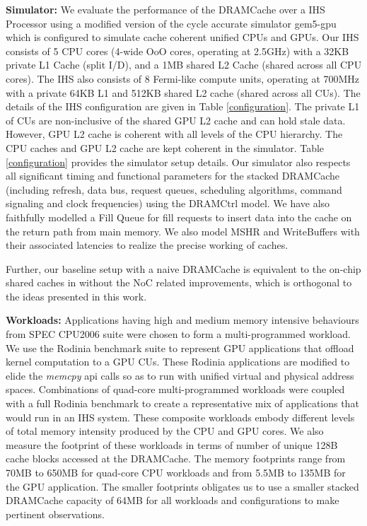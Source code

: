 \par \textbf{Simulator:} We evaluate the performance of the DRAMCache over a IHS Processor using a modified version of the cycle accurate simulator gem5-gpu \cite{gem5-gpu} which is configured to simulate cache coherent unified CPUs and GPUs. 
Our IHS consists of 5 CPU cores (4-wide OoO cores, operating at 2.5GHz) with a 32KB private L1 Cache (split I/D), and a 1MB shared L2 Cache (shared across all CPU cores). The IHS also consists of 8 Fermi-like compute units, operating at 700MHz with a private 64KB L1 and 512KB shared L2 cache (shared across all CUs). The details of the IHS configuration are given in Table \ref{configuration}. The private L1 of CUs are non-inclusive of the shared GPU L2 cache and can hold stale data. However, GPU L2 cache is coherent with all levels of the CPU hierarchy. The CPU caches and GPU L2 cache are kept coherent in the simulator. Table \ref{configuration} provides the simulator setup details. 
Our simulator also respects all significant timing and functional parameters for the stacked DRAMCache (including refresh, data bus, request queues, scheduling algorithms, command signaling and clock frequencies) using the DRAMCtrl \cite{dramctrl} model. We have also faithfully modelled  a Fill Queue \cite{dca} for fill requests to insert data into the cache on the return path from main memory. We also model MSHR and WriteBuffers with their associated latencies to realize the precise working of caches. 
\par Further, our baseline setup with a naive DRAMCache is equivalent to the on-chip shared caches in \cite{oscar} without the NoC related improvements, which is orthogonal to the ideas presented in this work.

\par \textbf{Workloads:} Applications having high and medium memory intensive behaviours from SPEC CPU2006 suite \cite{spec2006} were chosen to form a multi-programmed workload. We use the Rodinia benchmark suite \cite{rodinia} to represent GPU applications that offload kernel computation to a GPU CUs. These Rodinia applications are modified to elide the \textit{memcpy} api calls so as to run with unified virtual and physical address spaces. Combinations of quad-core multi-programmed workloads were coupled with a full Rodinia benchmark to create a representative mix of applications that would run in an IHS system. These composite workloads embody different levels of total memory intensity produced by the CPU and GPU cores. We also measure the footprint of these workloads in terms of number of unique 128B cache blocks accessed at the DRAMCache. The memory footprints range from 70MB to 650MB for quad-core CPU workloads and from 5.5MB to 135MB for the GPU application. 
The smaller footprints obligates us to use a smaller stacked DRAMCache capacity of 64MB for all workloads and configurations to make pertinent observations.



